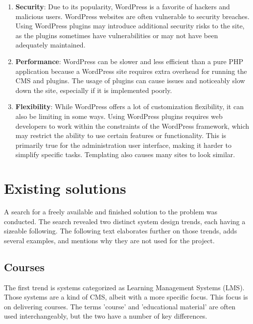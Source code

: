 \documentclass[
  digital,     %
  oneside,     %
  nosansbold,  %
  colorbold, %
  lof,         %
  lot,         %
]{fithesis4}
\begin{document}
\begin{enumerate}
	
	\item \textbf{Security}: Due to its popularity, WordPress is a favorite of hackers
and malicious users. WordPress websites are often vulnerable to security breaches.
Using WordPress plugins may introduce additional security risks to the site, as the
plugins sometimes have vulnerabilities or may not have been adequately maintained.
	
	\item \textbf{Performance}: WordPress can be slower and less efficient than a pure
PHP application because a WordPress site requires extra overhead for running the CMS
and plugins. The usage of plugins can cause issues and noticeably slow down the site,
especially if it is implemented poorly.
	
	\item \textbf{Flexibility}: While WordPress offers a lot of customization flexibility,
it can also be limiting in some ways. Using WordPress plugins requires web developers
to work within the constraints of the WordPress framework, which may restrict the
ability to use certain features or functionality. This is primarily true for the administration
user interface, making it harder to simplify specific tasks. Templating also causes many
sites to look similar.

\end{enumerate}

\section{Existing solutions}

A search for a freely available and finished solution to the problem was conducted. The search revealed two distinct system design trends, each having a sizeable following. The following text elaborates further on those trends, adds several examples, and mentions why they are not used for the project.

\subsection{Courses}

The first trend is systems categorized as Learning Management Systems (LMS). Those systems are a kind of CMS, albeit with a more specific focus. This focus is on delivering courses. The terms 'course' and 'educational material' are often used interchangeably, but the two have a number of key differences.
\end{document}
